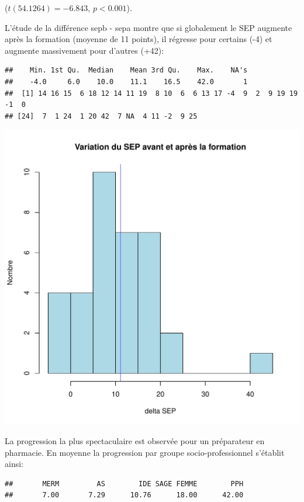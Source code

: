 \documentclass[12pt,english,french]{article}\usepackage{graphicx, color}
\makeatletter
\def\maxwidth{ %
  \ifdim\Gin@nat@width>\linewidth
    \linewidth
  \else
    \Gin@nat@width
  \fi
}
\newenvironment{kframe}{%
 \def\at@end@of@kframe{}%
 \ifinner\ifhmode%
  \def\at@end@of@kframe{\end{minipage}}%
  \begin{minipage}{\columnwidth}%
 \fi\fi%
 \def\FrameCommand##1{\hskip\@totalleftmargin \hskip-\fboxsep
 \colorbox{shadecolor}{##1}\hskip-\fboxsep
     \hskip-\linewidth \hskip-\@totalleftmargin \hskip\columnwidth}%
 \MakeFramed {\advance\hsize-\width
   \@totalleftmargin\z@ \linewidth\hsize
   \@setminipage}}%
 {\par\unskip\endMakeFramed%
 \at@end@of@kframe}
\newenvironment{knitrout}{}{} %
\makeatother
\begin{document}
($t(54.1264)=-6.843$,
$p < 0.001$).


L'étude de la différence sepb - sepa montre que si globalement le SEP augmente après la formation (moyenne de 11 points), il régresse pour certains (-4) et augmente massivement pour d'autres (+42):
\begin{knitrout}
\color{fgcolor}\begin{kframe}
\begin{verbatim}
##    Min. 1st Qu.  Median    Mean 3rd Qu.    Max.    NA's 
##    -4.0     6.0    10.0    11.1    16.5    42.0       1
##  [1] 14 16 15  6 18 12 14 11 19  8 10  6  6 13 17 -4  9  2  9 19 19 -1  0
## [24]  7  1 24  1 20 42  7 NA  4 11 -2  9 25
\end{verbatim}
\end{kframe}
\includegraphics[width=\maxwidth]{figure/sep9a-b} 

\end{knitrout}

La progression la plus spectaculaire est observée pour un préparateur en pharmacie. En moyenne la progression par groupe socio-professionnel s'établit ainsi:
\begin{knitrout}
\color{fgcolor}\begin{kframe}
\begin{verbatim}
##       MERM         AS        IDE SAGE FEMME        PPH 
##       7.00       7.29      10.76      18.00      42.00
\end{verbatim}
\end{kframe}
\end{knitrout}
\end{document}
